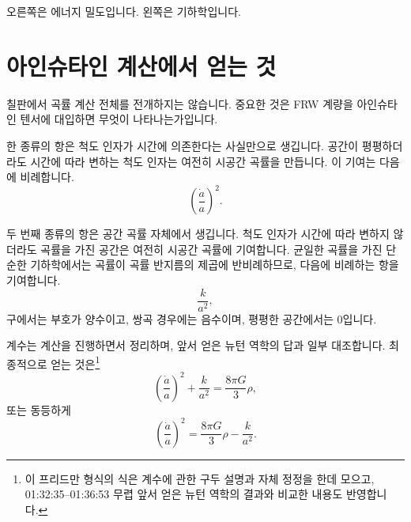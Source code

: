 오른쪽은 에너지 밀도입니다. 왼쪽은 기하학입니다.

\begin{classroomqa}
\end{classroomqa}

\begin{classroomqa}
\end{classroomqa}

\section{아인슈타인 계산에서 얻는 것}

칠판에서 곡률 계산 전체를 전개하지는 않습니다. 중요한 것은 FRW 계량을 아인슈타인 텐서에 대입하면 무엇이 나타나는가입니다.

한 종류의 항은 척도 인자가 시간에 의존한다는 사실만으로 생깁니다. 공간이 평평하더라도 시간에 따라 변하는 척도 인자는 여전히 시공간 곡률을 만듭니다. 이 기여는 다음에 비례합니다.
\begin{equation}
\left(\frac{\dot a}{a}\right)^2.
\end{equation}

두 번째 종류의 항은 공간 곡률 자체에서 생깁니다. 척도 인자가 시간에 따라 변하지 않더라도 곡률을 가진 공간은 여전히 시공간 곡률에 기여합니다. 균일한 곡률을 가진 단순한 기하학에서는 곡률이 곡률 반지름의 제곱에 반비례하므로, 다음에 비례하는 항을 기여합니다.
\begin{equation}
\frac{k}{a^2},
\end{equation}
구에서는 부호가 양수이고, 쌍곡 경우에는 음수이며, 평평한 공간에서는 0입니다.

\begin{classroomqa}
\end{classroomqa}

계수는 계산을 진행하면서 정리하며, 앞서 얻은 뉴턴 역학의 답과 일부 대조합니다. 최종적으로 얻는 것은\footnote{이 프리드만 형식의 식은 계수에 관한 구두 설명과 자체 정정을 한데 모으고, 01:32:35--01:36:53 무렵 앞서 얻은 뉴턴 역학의 결과와 비교한 내용도 반영합니다.}
\begin{equation}
\left(\frac{\dot a}{a}\right)^2+\frac{k}{a^2}=\frac{8\pi G}{3}\rho,
\end{equation}
또는 동등하게
\begin{equation}
\left(\frac{\dot a}{a}\right)^2=\frac{8\pi G}{3}\rho-\frac{k}{a^2}.
\end{equation}

